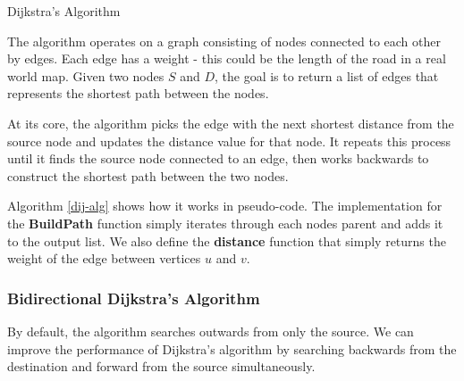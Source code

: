 \documentclass[ %
                    author={Alexander Hill},
                supervisor={Dr. Benjamin Sach},
                    degree={MEng},
                     title={MARMOSET},
                  subtitle={Multi-Agent Route Management using Online Simulation for Efficient Transportation},
                      type={research},
                      year={2016} ]{dissertation}
\begin{document}
\begin{algorithm}[h]
\DontPrintSemicolon
\SetAlgoLined


\caption{Dijkstra's Algorithm}\label{dij-alg}
\end{algorithm}

The algorithm operates on a graph consisting of nodes connected to each other by
edges. Each edge has a weight - this could be the length of the road in a real
world map. Given two nodes $S$ and $D$, the goal is to return a list of edges
that represents the shortest path between the nodes.

At its core, the algorithm picks the edge with the next shortest distance from
the source node and updates the distance value for that node. It repeats this
process until it finds the source node connected to an edge, then works
backwards to construct the shortest path between the two nodes.

Algorithm \ref{dij-alg} shows how it works in pseudo-code. The implementation for
the \textbf{BuildPath} function simply iterates through each nodes parent and
adds it to the output list. We also define the \textbf{distance} function that
simply returns the weight of the edge between vertices $u$ and $v$.

\subsubsection{Bidirectional Dijkstra's Algorithm}

By default, the algorithm searches outwards from only the source. We can improve
the performance of Dijkstra's algorithm by searching backwards from the
destination and forward from the source simultaneously.
\end{document}
